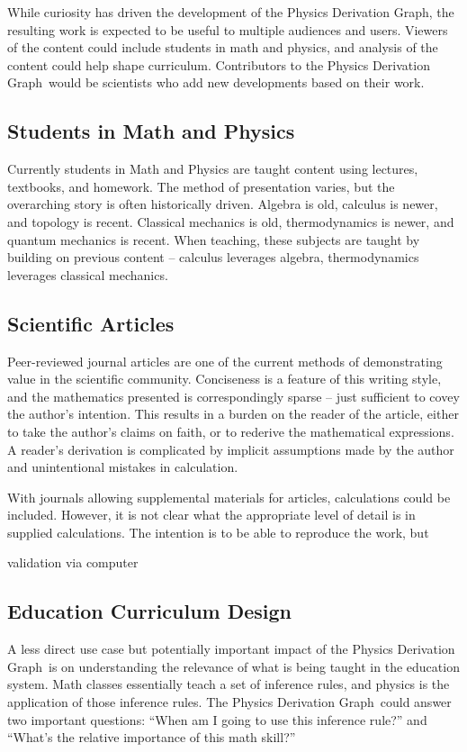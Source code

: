 \documentclass{article}
\newcommand{\pdg}{Physics Derivation Graph}
\begin{document}
\begin{multicols}{2}
While curiosity has driven the development of the \pdg, the resulting work is expected to be useful to multiple audiences and users. Viewers of the content could include students in math and physics, and analysis of the content could help shape curriculum. Contributors to the \pdg\ would be scientists who add new developments based on their work.

\subsection{Students in Math and Physics}

Currently students in Math and Physics are taught content using lectures, textbooks, and homework. The method of presentation varies, but the overarching story is often historically driven. Algebra is old, calculus is newer, and topology is recent. Classical mechanics is old, thermodynamics is newer, and quantum mechanics is recent. When teaching, these subjects are taught by building on previous content -- calculus leverages algebra, thermodynamics leverages classical mechanics. 

\subsection{Scientific Articles}

Peer-reviewed journal articles are one of the current methods of demonstrating value in the scientific community. Conciseness is a feature of this writing style, and the mathematics presented is correspondingly sparse -- just sufficient to covey the author's intention. This results in a burden on the reader of the article, either to take the author's claims on faith, or to rederive the mathematical expressions. A reader's derivation is complicated by implicit assumptions made by the author and unintentional mistakes in calculation. 

With journals allowing supplemental materials for articles, calculations could be included. However, it is not clear what the appropriate level of detail is in supplied calculations. The intention is to be able to reproduce the work, but 

validation via computer 

\subsection{Education Curriculum Design}

A less direct use case but potentially important impact of the \pdg\ is on understanding the relevance of what is being taught in the education system. Math classes essentially teach a set of inference rules, and physics is the application of those inference rules. The \pdg\ could answer two important questions: ``When am I going to use this inference rule?'' and ``What's the relative importance of this math skill?''


\end{multicols}
\end{document}
